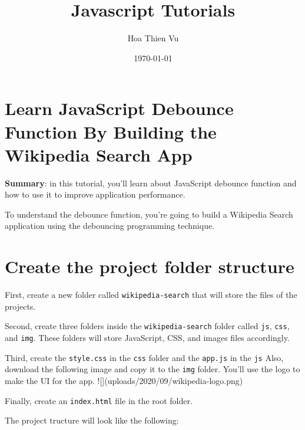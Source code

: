\documentclass[11pt]{article}
\title{\textbf{Javascript Tutorials}}
\author{Hoa Thien Vu}
\date{\today}
\begin{document}
\maketitle
\newpage
\tableofcontents
\cleardoublepage
\newpage
\noindent
{}
\section*{\huge Learn JavaScript Debounce Function By Building the Wikipedia Search App}

\begin{displayquote}
\textbf{Summary}: in this tutorial, you'll learn about JavaScript debounce 
function and how to use it to improve application performance.
\end{displayquote}

\noindent
To understand the debounce function, you're going to build a Wikipedia
Search application using the debouncing programming technique.

\section*{Create the project folder structure}

First, create a new folder called \verb|wikipedia-search| that will store
the files of the projects.
\newline

\noindent
Second, create three folders inside the \verb|wikipedia-search| folder called
\verb|js|, \verb|css|, and \verb|img|. These folders will store JavaScript, CSS, and
images files accordingly.
\newline

\noindent
Third, create the \verb|style.css| in the \verb|css| folder and the \verb|app.js| in
the \verb|js| Also, download the following image and copy it to the \verb|img|
folder. You'll use the logo to make the UI for the app.
![](uploads/2020/09/wikipedia-logo.png)

\noindent
Finally, create an \verb|index.html| file in the root folder.
\newline

\noindent
The project tructure will look like the following:
\end{document}
